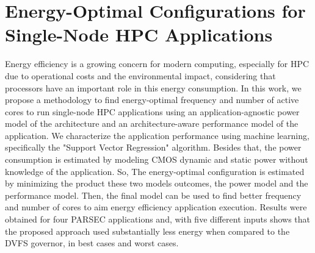 
\section{Energy-Optimal Configurations for Single-Node HPC Applications\\
}

Energy efficiency is a growing concern for modern computing, especially for HPC due to operational costs and the environmental impact, considering that processors have an important role in this energy consumption. In this work, we propose a methodology to find energy-optimal frequency and number of active cores to run single-node HPC applications using an application-agnostic power model of the architecture and an architecture-aware performance model of the application. We characterize the application performance using machine learning, specifically the "Support Vector Regression" algorithm. Besides that, the power consumption is estimated by modeling CMOS dynamic and static power without knowledge of the application. So, The energy-optimal configuration is estimated by minimizing the product these two models outcomes, the power model and the performance model. Then, the final model can be used to find better frequency and number of cores to aim energy efficiency application execution. Results were obtained for four PARSEC applications and, with five different inputs shows that the proposed approach used substantially less energy when compared to the DVFS governor, in best cases and worst cases.


